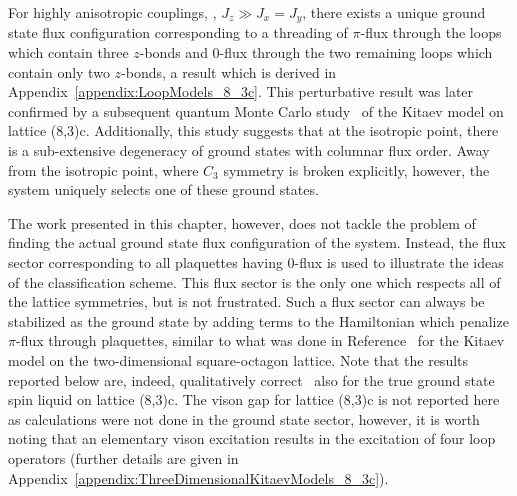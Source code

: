 For highly anisotropic couplings, \eg, $J_z \gg J_x = J_y$, there exists a unique ground state flux configuration corresponding to a threading of $\pi$-flux through the loops which contain three $z$-bonds and $0$-flux through the two remaining loops which contain only two $z$-bonds, a result which is derived in Appendix~\ref{appendix:LoopModels_8_3c}.
This perturbative result was later confirmed by a subsequent quantum Monte Carlo study~\cite{EschmannPRL2019} of the Kitaev model on lattice (8,3)c.
Additionally, this study suggests that at the isotropic point, there is a sub-extensive degeneracy of ground states with columnar flux order.
Away from the isotropic point, where $C_3$ symmetry is broken explicitly, however, the system uniquely selects one of these ground states.

The work presented in this chapter, however, does not tackle the problem of finding the actual ground state flux configuration of the system.
Instead, the flux sector corresponding to all plaquettes having $0$-flux is used to illustrate the ideas of the classification scheme.
This flux sector is the only one which respects all of the lattice symmetries, but is not frustrated.
Such a flux sector can always be stabilized as the ground state by adding terms to the Hamiltonian which penalize $\pi$-flux through plaquettes, similar to what was done in Reference~\cite{LaiPRB2011} for the Kitaev model on the two-dimensional square-octagon lattice.
Note that the results reported below are, indeed, qualitatively correct~\cite{EschmannPRL2019} also for the true ground state spin liquid on lattice (8,3)c.
The vison gap for lattice (8,3)c is not reported here as calculations were not done in the ground state sector, however, it is worth noting that an elementary vison excitation results in the excitation of four loop operators (further details are given in Appendix~\ref{appendix:ThreeDimensionalKitaevModels_8_3c}).


%
%

